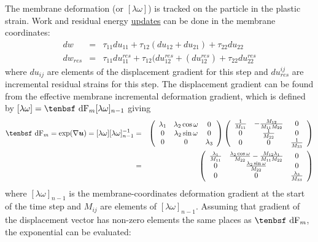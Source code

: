 \documentclass[11pt]{book}
\renewcommand{\vec}[1]{\boldsymbol{#1}}
\def\dF{\hbox{\tenbsf dF}}
\begin{document}
The membrane deformation (or $[\lambda\omega]$) is tracked on the particle in the plastic strain. Work and residual energy \hyperref[EnergyUpdates]{updates} can be done in the membrane coordinates:
\begin{eqnarray}
         dw & = & \tau_{11} du_{11} + \tau_{12}(du_{12}+du_{21}) + \tau_{22} du_{22}  \label{memwork} \\
         dw_{res} & = & \tau_{11} du_{11}^{res} + \tau_{12} (du_{12}^{res}+(du_{12}^{res}) 
                  + \tau_{22} du_{22}^{res}
\end{eqnarray}
where $du_{ij}$ are elements of the displacement gradient for this step and $du_{res}^{ij}$ are incremental residual strains for this step. The displacement gradient can be found from the effective membrane incremental deformation gradient, which is defined by $[\lambda\omega] = \dF_{m}  [\lambda\omega]_{n-1}$ giving
\begin{eqnarray}
      \dF_{m} = \exp(\nabla \vec u) = [\lambda\omega][\lambda\omega]_{n-1}^{-1}
            & = & \left(\begin{array}{ccc} \lambda_1 & \lambda_2\cos\omega & 0 \\
                                                0 & \lambda_2\sin\omega & 0 \\
                                                 0 & 0 & \lambda_3
                 \end{array}\right)\left(\begin{array}{ccc} {1\over M_{11}} & -{M_{12}\over M_{11}M_{22}} & 0 \\
                                       0 & {1\over M_{22}} & 0 \\
                                        0 & 0 & {1\over M_{33}}
                 \end{array}\right) \\
         & = & \left(\begin{array}{ccc} {\lambda_1\over M_{11}} & {\lambda_2\cos\omega\over M_{22}} 
                                                                -{M_{12}\lambda_1\over M_{11}M_{22}}& 0 \\
                                                0 & {\lambda_2\sin\omega\over M_{22}} & 0 \\
                                                 0 & 0 & {\lambda_3\over M_{33}}
                 \end{array}\right)
\end{eqnarray}
where $[\lambda\omega]_{n-1}$ is the membrane-coordinates deformation gradient at the start of the time step and $M_{ij}$ are elements of $[\lambda\omega]_{n-1}$. Assuming that gradient of the displacement vector has non-zero elements the same places as $\dF_{m}$, the exponential can be evaluated:
\end{document}
